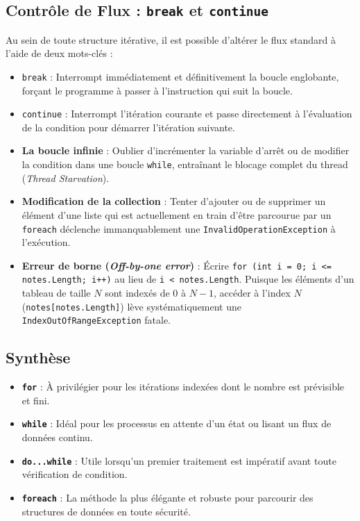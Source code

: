 \subsection{Contrôle de Flux : \texttt{break} et \texttt{continue}}
Au sein de toute structure itérative, il est possible d'altérer le flux standard à l'aide de deux mots-clés :
\begin{itemize}
    \item \texttt{break} : Interrompt immédiatement et définitivement la boucle englobante, forçant le programme à passer à l'instruction qui suit la boucle.
    \item \texttt{continue} : Interrompt l'itération courante et passe directement à l'évaluation de la condition pour démarrer l'itération suivante.
\end{itemize}

\begin{tcolorbox}[colback=backcolour,colframe=keywordcolor,title=\textbf{Pièges Courants \& Erreurs}]
\begin{itemize}
    \item \textbf{La boucle infinie} : Oublier d'incrémenter la variable d'arrêt ou de modifier la condition dans une boucle \texttt{while}, entraînant le blocage complet du thread (\textit{Thread Starvation}).
    \item \textbf{Modification de la collection} : Tenter d'ajouter ou de supprimer un élément d'une liste qui est actuellement en train d'être parcourue par un \texttt{foreach} déclenche immanquablement une \texttt{InvalidOperationException} à l'exécution.
    \item \textbf{Erreur de borne (\textit{Off-by-one error})} : Écrire \texttt{for (int i = 0; i <= notes.Length; i++)} au lieu de \texttt{i < notes.Length}. Puisque les éléments d'un tableau de taille $N$ sont indexés de $0$ à $N-1$, accéder à l'index $N$ (\texttt{notes[notes.Length]}) lève systématiquement une \texttt{IndexOutOfRangeException} fatale.
\end{itemize}
\end{tcolorbox}

\subsection{Synthèse}
\begin{itemize}
    \item \textbf{\texttt{for}} : À privilégier pour les itérations indexées dont le nombre est prévisible et fini.
    \item \textbf{\texttt{while}} : Idéal pour les processus en attente d'un état ou lisant un flux de données continu.
    \item \textbf{\texttt{do...while}} : Utile lorsqu'un premier traitement est impératif avant toute vérification de condition.
    \item \textbf{\texttt{foreach}} : La méthode la plus élégante et robuste pour parcourir des structures de données en toute sécurité.
\end{itemize}
